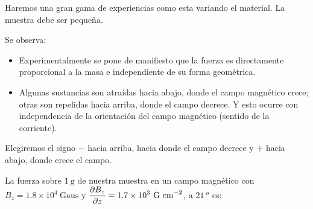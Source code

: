 Haremos una gran gama de experiencias como esta variando el material. La muestra debe ser pequeña.

Se observa:

\begin{itemize}
\item Experimentalmente se pone de manifiesto que la fuerza es directamente proporcional a la masa e independiente de su forma geométrica.
\item Algunas sustancias son atraídas hacia abajo, donde el campo magnético crece; otras son repelidas hacia arriba, donde el campo decrece. Y esto ocurre con independencia de la orientación del campo magnético (sentido de la corriente).	
\end{itemize}

Elegiremos el signo $-$ hacia arriba, hacia donde el campo decrece y $+$ hacia abajo, donde crece el campo.

La fuerza sobre $1 \ \mathrm{g}$ de nuestra muestra en un campo magnético con $B_z=1.8\times 10^4\ \mathrm{Gaus}$ y $\displaystyle \pdv {B_z} {z}=1.7\times 10^3 \ \mathrm{G\ cm}^{-2}$, a $21\ ^o$ es:



